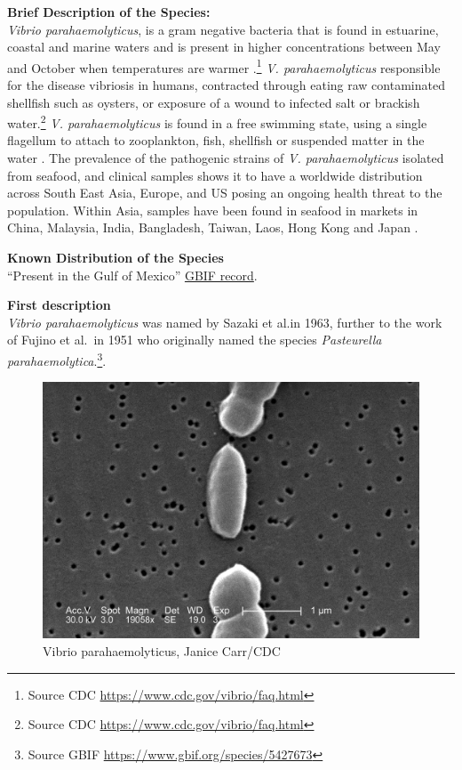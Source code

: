 \documentclass[openany]{book}
\let\rmarkdownfootnote\footnote%
\def\footnote{\protect\rmarkdownfootnote}
\theoremstyle{definition}
\theoremstyle{definition}
\theoremstyle{definition}
\theoremstyle{remark}
\begin{document}
\textbf{Brief Description of the Species:}\\
\emph{Vibrio parahaemolyticus}, is a gram negative bacteria that is
found in estuarine, coastal and marine waters and is present in higher
concentrations between May and October when temperatures are warmer
\citep{Letchumanan_2014}.\footnote{Source CDC
  \url{https://www.cdc.gov/vibrio/faq.html}} \emph{V. parahaemolyticus}
responsible for the disease vibriosis in humans, contracted through
eating raw contaminated shellfish such as oysters, or exposure of a
wound to infected salt or brackish water.\footnote{Source CDC
  \url{https://www.cdc.gov/vibrio/faq.html}} \emph{V. parahaemolyticus}
is found in a free swimming state, using a single flagellum to attach to
zooplankton, fish, shellfish or suspended matter in the water
\citep{Letchumanan_2014}. The prevalence of the pathogenic strains of
\emph{V. parahaemolyticus} isolated from seafood, and clinical samples
shows it to have a worldwide distribution across South East Asia,
Europe, and US posing an ongoing health threat to the population. Within
Asia, samples have been found in seafood in markets in China, Malaysia,
India, Bangladesh, Taiwan, Laos, Hong Kong and Japan
\citep{Letchumanan_2014}.

\textbf{Known Distribution of the Species}\\
``Present in the Gulf of Mexico''
\href{http://www.gbif.org/species/5427673}{GBIF record}.

\textbf{First description}\\
\emph{Vibrio parahaemolyticus} was named by Sazaki et al.in 1963,
further to the work of Fujino et al.~in 1951 who originally named the
species \emph{Pasteurella parahaemolytica}.\footnote{Source GBIF
  \url{https://www.gbif.org/species/5427673}}.

\begin{figure}

{\centering \includegraphics[width=0.7\linewidth]{images_species/Vibrio_parahaemolyticus_01} 

}

\caption{Vibrio parahaemolyticus, Janice Carr/CDC}\label{fig:unnamed-chunk-10}
\end{figure}
\end{document}

